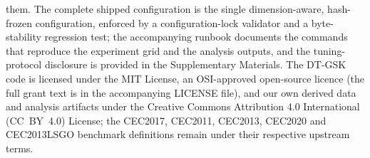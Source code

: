 \documentclass[algorithms,article,submit,moreauthors,pdftex]{Definitions/mdpi}
\newcommand{\dtgsk}{DT-GSK}
\begin{document}
them. %
The complete shipped configuration is the single dimension-aware,
hash-frozen configuration, enforced by a configuration-lock validator
and a byte-stability regression test; the accompanying runbook
documents the commands that reproduce the
experiment grid and the analysis outputs, and the tuning-protocol
disclosure is provided in the Supplementary
Materials. The \dtgsk{} code is licensed under the MIT License, an
OSI-approved open-source licence (the full grant text is in the
accompanying LICENSE file), and our own derived data and
analysis artifacts under the Creative Commons Attribution 4.0 International
(CC~BY~4.0) License; the CEC2017, CEC2011, CEC2013, CEC2020 and
CEC2013LSGO benchmark definitions remain
under their respective upstream terms. %
\end{document}
